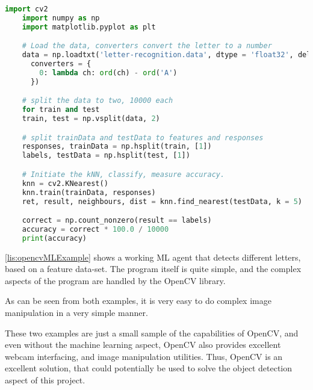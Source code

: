 \begin{lstlisting}[language=Python,label=lis:opencvMLExample,caption=Source code OpenCV documentation\cite{opencvMLexamples}.]
	import cv2
	import numpy as np
	import matplotlib.pyplot as plt

	# Load the data, converters convert the letter to a number
	data = np.loadtxt('letter-recognition.data', dtype = 'float32', delimiter = ',',
	  converters = {
	    0: lambda ch: ord(ch) - ord('A')
	  })

	# split the data to two, 10000 each
	for train and test
	train, test = np.vsplit(data, 2)

	# split trainData and testData to features and responses
	responses, trainData = np.hsplit(train, [1])
	labels, testData = np.hsplit(test, [1])

	# Initiate the kNN, classify, measure accuracy.
	knn = cv2.KNearest()
	knn.train(trainData, responses)
	ret, result, neighbours, dist = knn.find_nearest(testData, k = 5)

	correct = np.count_nonzero(result == labels)
	accuracy = correct * 100.0 / 10000
	print(accuracy)
\end{lstlisting}

\autoref{lis:opencvMLExample} shows a working ML agent that detects different letters, based on a feature data-set.
The program itself is quite simple, and the complex aspects of the program are handled by the OpenCV library.

As can be seen from both examples, it is very easy to do complex image manipulation in a very simple manner.

These two examples are just a small sample of the capabilities of OpenCV, and even without the machine learning aspect, OpenCV also provides excellent webcam interfacing, and image manipulation utilities.
Thus, OpenCV is an excellent solution, that could potentially be used to solve the object detection aspect of this project.



